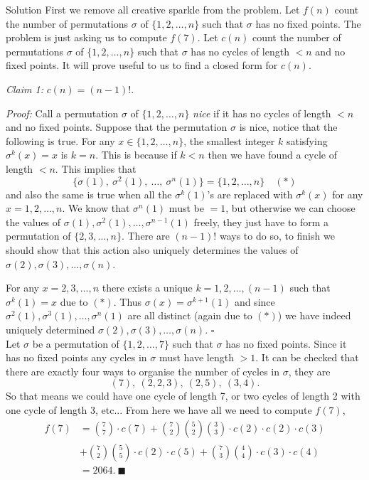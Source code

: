 \documentclass{article}
\begin{document}
\begin{solution}{Solution}
First we remove all creative sparkle from the problem. Let $f(n)$
count the number of permutations $\sigma$ of $\{1,2,\ldots, n\}$ such
that $\sigma$ has no fixed points. The problem is just asking us to compute
$f(7)$. \vspace{0.2cm}
Let $c(n)$ count the number of permutations $\sigma$ of
$\{1,2,\ldots, n\}$ such that $\sigma$ has no cycles of length $<n$
and no fixed points. It will prove useful to us to find a closed form
for $c(n)$.
\vspace{0.2cm}

\textit{Claim 1:} $c(n) = (n-1)!$. \vspace{0.2cm}

\textit{Proof:} Call a permutation $\sigma$ of $\{1,2,\ldots, n\}$
\textit{nice} if it has no cycles of length $< n$ and no fixed points.
Suppose that the permutation $\sigma$ is nice,
notice that the following is true. For any $x \in \{1,2,\ldots, n\}$,
the smallest integer $k$ satisfying $\sigma^k (x) = x$ is $k = n$.
This is because if $k < n$ then we have found a cycle of length $< n$.
This implies that
$$
\{ \sigma(1), \ \sigma^2(1), \ \ldots, \ \sigma^n(1) \}
=
\{ 1,2,\ldots, n \} \quad (*)
$$
and also the same is true when all the $\sigma^k (1)$'s are replaced with
$\sigma^k (x)$ for any $x = 1,2,\ldots,n$.
We know that $\sigma^n (1)$ must be $=1$, but otherwise we can choose the
values of $\sigma(1), \sigma^2(1), \ldots, \sigma^{n-1}(1)$ freely, they
just have to form a permutation of $\{2,3,\ldots,n\}$.
There are $(n-1)!$ ways to do so, to finish we should show that this action
also uniquely determines the values of
$\sigma(2), \sigma(3), \ldots, \sigma(n)$.
\vspace{0.2cm}

For any $x = 2,3,\ldots,n$ there exists a unique $k = 1,2,\ldots,(n-1)$
such that $\sigma^k (1) = x$ due to $(*)$. Thus
$\sigma(x) = \sigma^{k+1}(1)$ and since
$\sigma^2(1), \sigma^3(1), \ldots, \sigma^n(1)$ are all distinct
(again due to $(*)$) we have indeed uniquely determined
$\sigma(2), \sigma(3), \ldots, \sigma(n)$. $\square$ \\

Let $\sigma$ be a permutation of $\{1,2,\ldots, 7\}$ such that
$\sigma$ has no fixed points. Since it has no fixed points any cycles
in $\sigma$ must have length $ > 1$. It can be checked that there are
exactly four ways to organise the number of cycles in $\sigma$, they are
$$
(7), \ (2,2,3), \ (2,5), \ (3,4).
$$
So that means we could have one cycle of length 7, or two cycles of length
2 with one cycle of length 3, etc... From here we have all we need to
compute $f(7)$,
\[
\begin{aligned}
f(7) &= \binom{7}{7}\cdot c(7) + \binom{7}{2} \binom{5}{2} \binom{3}{3}
\cdot c(2) \cdot c(2) \cdot c(3) \\ &+
\binom{7}{2}\binom{5}{5} \cdot c(2) \cdot c(5) +
\binom{7}{3}\binom{4}{4} \cdot c(3) \cdot c(4) \\
&= 2064. \ \blacksquare
\end{aligned}
\]
\\


\end{solution}
\end{document}
